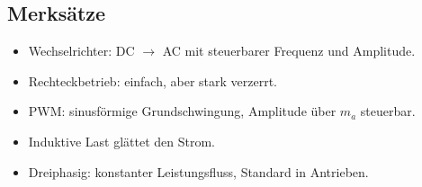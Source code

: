 \subsection{Merksätze}

\begin{itemize}
    \item Wechselrichter: DC $\rightarrow$ AC mit steuerbarer Frequenz und Amplitude.
    \item Rechteckbetrieb: einfach, aber stark verzerrt.
    \item PWM: sinusförmige Grundschwingung, Amplitude über $m_a$ steuerbar.
    \item Induktive Last glättet den Strom.
    \item Dreiphasig: konstanter Leistungsfluss, Standard in Antrieben.
\end{itemize}

